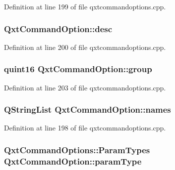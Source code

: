 Definition at line 199 of file qxtcommandoptions.\-cpp.

\hypertarget{struct_qxt_command_option_ad4055f9344df08abd7512dd017300291}{
\subsubsection[{desc}]{ Qxt\-Command\-Option\-::desc}}\label{struct_qxt_command_option_ad4055f9344df08abd7512dd017300291}


Definition at line 200 of file qxtcommandoptions.\-cpp.

\hypertarget{struct_qxt_command_option_ae4177f7802b5d07478bbd54d690482ac}{
\subsubsection[{group}]{\setlength{\rightskip}{0pt plus 5cm}quint16 Qxt\-Command\-Option\-::group}}\label{struct_qxt_command_option_ae4177f7802b5d07478bbd54d690482ac}


Definition at line 203 of file qxtcommandoptions.\-cpp.

\hypertarget{struct_qxt_command_option_afe825653fae1009fefcb8ec59fbac342}{
\subsubsection[{names}]{\setlength{\rightskip}{0pt plus 5cm}Q\-String\-List Qxt\-Command\-Option\-::names}}\label{struct_qxt_command_option_afe825653fae1009fefcb8ec59fbac342}


Definition at line 198 of file qxtcommandoptions.\-cpp.

\hypertarget{struct_qxt_command_option_a6138565d88b6fc850853dc4fc760f37b}{
\subsubsection[{param\-Type}]{\setlength{\rightskip}{0pt plus 5cm}Qxt\-Command\-Options\-::\-Param\-Types Qxt\-Command\-Option\-::param\-Type}}\label{struct_qxt_command_option_a6138565d88b6fc850853dc4fc760f37b}


